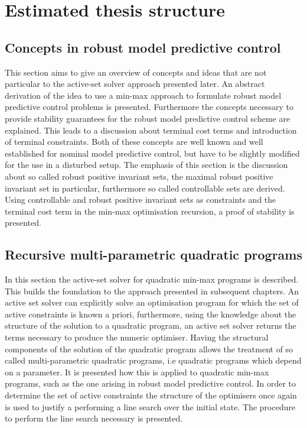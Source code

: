\documentclass{article}
\begin{document}
\section*{Estimated thesis structure}

\setcounter{subsection}{1}

\subsection{Concepts in robust model predictive control}\label{chap:concepts}
This section aims to give an overview of concepts and ideas that are not particular to
the active-set solver approach presented later.
%
An abstract derivation of the idea to use a min-max approach to formulate robust model predictive control
problems is presented.
%
Furthermore the concepts necessary to provide stability guarantees for the robust model predictive control
scheme are explained.
%
This leads to a discussion about terminal cost terms and introduction of terminal constraints. 
%
Both of these concepts are well known and well established for nominal model predictive control, but have to 
be slightly modified for the use in a disturbed setup. 
%
The emphasis of this section is the discussion about so called robust positive invariant sets, the maximal
robust positive invariant set in particular, furthermore so called controllable sets are derived.
%
Using controllable and robust positive invariant sets as constraints and the terminal cost term in the min-max optimisation
recursion, a proof of stability is presented.

\subsection{Recursive multi-parametric quadratic programs}\label{chap:recursive:mpqp}
In this section the active-set solver for quadratic min-max programs is described.
%
This builds the foundation to the approach presented in subsequent chapters.
%
An active set solver can explicitly solve an optimisation program for which the set of active constraints is
known a priori, furthermore, using the knowledge about the structure of the solution to a quadratic program,
an active set solver returns the terms necessary to produce the numeric optimiser.
%
Having the structural components of the solution of the quadratic program allows the treatment of so called
multi-parametric quadratic programs, i.e quadratic programs which depend on a parameter.
%
It is presented how this is applied to quadratic min-max programs, such as the one arising in robust model
predictive control.
%
In order to determine the set of active constraints the structure of the optimisers once again is used to
justify a performing a line search over the initial state.
%
The procedure to perform the line search necessary is presented.
\end{document}
